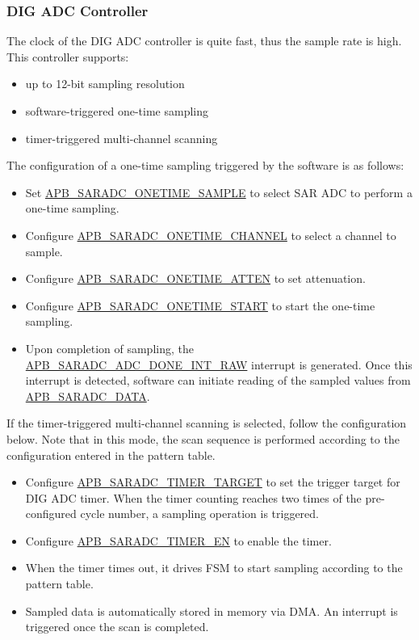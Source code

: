 \documentclass[main\_\_EN.tex]{subfiles}
\begin{document}
\subsubsection{DIG ADC Controller}

The clock of the DIG ADC controller is quite fast, thus the sample rate is high.
This controller supports: 

\begin{itemize}
    \item up to 12-bit sampling resolution
    \item software-triggered one-time sampling
    \item timer-triggered multi-channel scanning
\end{itemize}

The configuration of a one-time sampling triggered by the software is as follows:
\begin{itemize}
    \item Set \hyperref[fielddesc:APBSARADCONETIMESAMPLE]{APB\_SARADC\_ONETIME\_SAMPLE} to select SAR ADC to perform a one-time sampling.
    \item Configure \hyperref[fielddesc:APBSARADCONETIMECHANNEL]{APB\_SARADC\_ONETIME\_CHANNEL} to select a channel to sample.
    \item Configure \hyperref[fielddesc:APBSARADCONETIMEATTEN]{APB\_SARADC\_ONETIME\_ATTEN} to set attenuation.
    \item Configure \hyperref[fielddesc:APBSARADCONETIMESTART]{APB\_SARADC\_ONETIME\_START} to start the one-time sampling.
    \item Upon completion of sampling, the \hyperref[fielddesc:APBSARADCDONEINTRAW]{APB\_SARADC\_ADC\_DONE\_INT\_RAW} interrupt is generated. Once this interrupt is detected, software can initiate reading of the sampled values from \hyperref[fielddesc:APBSARADCDATA]{APB\_SARADC\_DATA}. 
\end{itemize}

If the timer-triggered multi-channel scanning is selected, follow the configuration below. Note that in this mode, the scan sequence is performed according to the configuration entered in the pattern table. 
\begin{itemize} 
        \item Configure \hyperref[fielddesc:APBSARADCTIMERTARGET]{APB\_SARADC\_TIMER\_TARGET} to set the trigger target for DIG ADC timer. When the timer counting reaches two times of the pre-configured cycle number, a sampling operation is triggered.
        \item Configure \hyperref[fielddesc:APBSARADCTIMEREN]{APB\_SARADC\_TIMER\_EN} to enable the timer.
        \item When the timer times out, it drives FSM to start sampling according to the pattern table.
        \item Sampled data is automatically stored in memory via DMA. An interrupt is triggered once the scan is completed.
\end{itemize}
\end{document}

